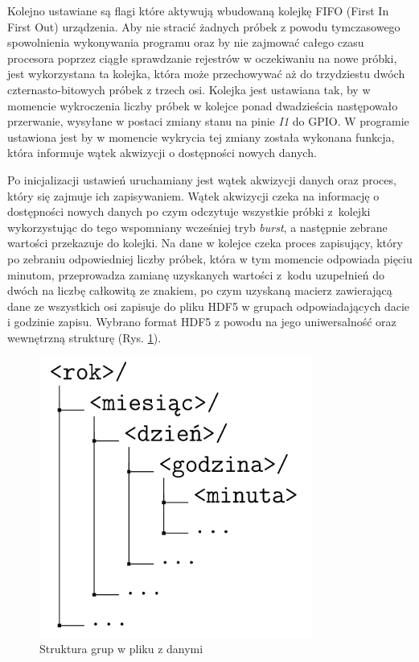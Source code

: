 \documentclass[a4paper,12pt]{mwart}
\begin{document}
Kolejno ustawiane są flagi które aktywują wbudowaną kolejkę FIFO (First In
First Out) urządzenia. Aby nie stracić żadnych próbek z powodu tymczasowego
spowolnienia wykonywania programu oraz by nie zajmować całego czasu procesora
poprzez ciągłe sprawdzanie rejestrów w oczekiwaniu na nowe próbki, jest
wykorzystana ta kolejka, która może przechowywać aż do trzydziestu dwóch
czternasto-bitowych próbek z trzech osi. Kolejka jest ustawiana tak, by w
momencie wykroczenia liczby próbek w kolejce ponad dwadzieścia następowało
przerwanie, wysyłane w postaci zmiany stanu na pinie \emph{I1} do GPIO.
W programie ustawiona jest by w momencie wykrycia tej zmiany została wykonana
funkcja, która informuje wątek akwizycji o dostępności nowych danych.

Po inicjalizacji ustawień uruchamiany jest wątek akwizycji danych oraz proces,
który się zajmuje ich zapisywaniem. Wątek akwizycji czeka na informację o
dostępności nowych danych po czym odczytuje wszystkie próbki z~kolejki
wykorzystując do tego wspomniany wcześniej tryb \emph{burst}, a następnie
zebrane wartości przekazuje do kolejki. Na dane w kolejce czeka proces
zapisujący, który po zebraniu odpowiedniej liczby próbek, która w tym momencie
odpowiada pięciu minutom, przeprowadza zamianę uzyskanych wartości z~kodu
uzupełnień do dwóch na liczbę całkowitą ze znakiem, po czym uzyskaną macierz
zawierającą dane ze wszystkich osi zapisuje do pliku HDF5 w grupach
odpowiadających dacie i godzinie zapisu. Wybrano format HDF5 z powodu na jego
uniwersalność oraz wewnętrzną strukturę (Rys. \ref{fig:struc}).

\begin{figure}[!tbh]
  \centering
  \includegraphics[width=0.8\textwidth]{bitgraphics/struktura.png}
  \caption{Struktura grup w pliku z danymi}
  \label{fig:struc}
\end{figure}
\end{document}
